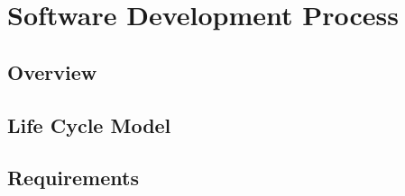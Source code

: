 \section{Software Development Process}
\label{sec:SoftwareDevelopmentProcess}

\subsection{Overview} 

\subsection{Life Cycle Model}

\subsection{Requirements}

